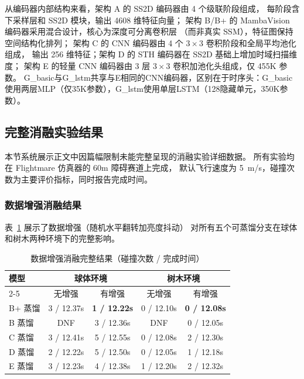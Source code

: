 \documentclass[12pt,a4paper]{article}
\numberwithin{equation}{section}
\numberwithin{figure}{section}
\numberwithin{table}{section}
\begin{document}
\noindent 从编码器内部结构来看，架构 A 的 SS2D 编码器由 4 个级联阶段组成，
每阶段含下采样层和 SS2D 模块，输出 4608 维特征向量；
架构 B/B+ 的 MambaVision 编码器采用混合设计，核心为深度可分离卷积层
（而非真实 SSM），特征图保持空间结构化排列；
架构 C 的 CNN 编码器由 4 个 $3\times3$ 卷积阶段和全局平均池化组成，
输出 256 维特征；架构 D 的 STH 编码器在 SS2D 基础上增加时域扫描维度；
架构 E 的轻量 CNN 编码器由 3 层 $3\times3$ 卷积加池化头组成，仅 455K 参数。
G\_basic与G\_lstm共享与E相同的CNN编码器，区别在于时序头：G\_basic使用两层MLP（仅35K参数），G\_lstm使用单层LSTM（128隐藏单元，350K参数）。

\subsection{完整消融实验结果}
\label{app:ablation}

本节系统展示正文中因篇幅限制未能完整呈现的消融实验详细数据。
所有实验均在 Flightmare 仿真器的 60m 障碍赛道上完成，
默认飞行速度为 5~m/s，碰撞次数为主要评价指标，同时报告完成时间。

\subsubsection{数据增强消融结果}

表~\ref{tab:app_aug} 展示了数据增强（随机水平翻转加亮度抖动）
对所有五个可蒸馏分支在球体和树木两种环境下的完整影响。

\begin{table}[H]
\centering
\caption{数据增强消融完整结果（碰撞次数 / 完成时间）}
\label{tab:app_aug}
\begin{tabular}{lcccc}
\toprule
\multirow{2}{*}{\textbf{模型}} & \multicolumn{2}{c}{\textbf{球体环境}} & \multicolumn{2}{c}{\textbf{树木环境}} \\
\cline{2-5}
 & 无增强 & 有增强 & 无增强 & 有增强 \\
\midrule
B+ 蒸馏 & 3 / 12.37s & \textbf{1 / 12.22s} & 0 / 12.10s & \textbf{0 / 12.08s} \\
B 蒸馏 & DNF & 3 / 12.36s & DNF & 0 / 12.05s \\
C 蒸馏 & 3 / 12.41s & 5 / 12.55s & 0 / 12.08s & 2 / 12.30s \\
D 蒸馏 & 2 / 12.22s & 5 / 12.50s & 0 / 12.05s & 1 / 12.18s \\
E 蒸馏 & 3 / 12.23s & 4 / 12.38s & 1 / 12.20s & 2 / 12.32s \\
\bottomrule
\end{tabular}
\end{table}
\end{document}
